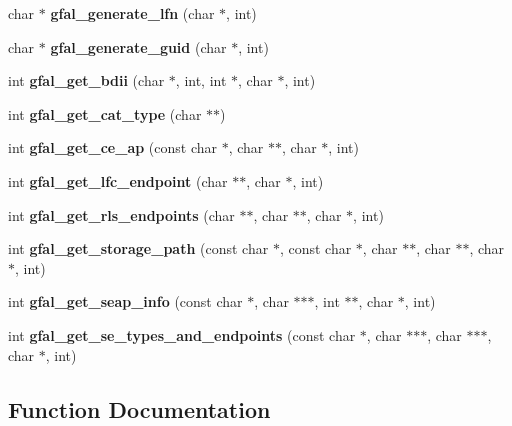\begin{CompactItemize}
\item 
char $\ast$ \textbf{gfal\_\-generate\_\-lfn} (char $\ast$, int)\label{group__internal__group_gcd48b57bf9659be5204319918c6f9d20}

\item 
char $\ast$ \textbf{gfal\_\-generate\_\-guid} (char $\ast$, int)\label{group__internal__group_g8311ede197e204e57029165fbc3898d6}

\item 
int \textbf{gfal\_\-get\_\-bdii} (char $\ast$, int, int $\ast$, char $\ast$, int)\label{group__internal__group_gc5a167111fbd4564bdbd7a194a8ebbad}

\item 
int \textbf{gfal\_\-get\_\-cat\_\-type} (char $\ast$$\ast$)\label{group__internal__group_gc08ad608f2ca57ec2883c799a3b6bf11}

\item 
int \textbf{gfal\_\-get\_\-ce\_\-ap} (const char $\ast$, char $\ast$$\ast$, char $\ast$, int)\label{group__internal__group_ged7eddae06a6ae76e7835ad89069f23f}

\item 
int \textbf{gfal\_\-get\_\-lfc\_\-endpoint} (char $\ast$$\ast$, char $\ast$, int)\label{group__internal__group_g6b5c96e786925f6ad93fa57f998173cc}

\item 
int \textbf{gfal\_\-get\_\-rls\_\-endpoints} (char $\ast$$\ast$, char $\ast$$\ast$, char $\ast$, int)\label{group__internal__group_ge98063cb83cedc1a6e6fe0ef8d35c447}

\item 
int \textbf{gfal\_\-get\_\-storage\_\-path} (const char $\ast$, const char $\ast$, char $\ast$$\ast$, char $\ast$$\ast$, char $\ast$, int)\label{group__internal__group_gb3f2c6e488fd2ede0d16bd7f4cdd3549}

\item 
int \textbf{gfal\_\-get\_\-seap\_\-info} (const char $\ast$, char $\ast$$\ast$$\ast$, int $\ast$$\ast$, char $\ast$, int)\label{group__internal__group_ge114394c3fd91f2ab9382dd884dd0693}

\item 
int \textbf{gfal\_\-get\_\-se\_\-types\_\-and\_\-endpoints} (const char $\ast$, char $\ast$$\ast$$\ast$, char $\ast$$\ast$$\ast$, char $\ast$, int)\label{group__internal__group_g2c87f70238deffb3907d5a612e847fd4}

\end{CompactItemize}


\subsection{Function Documentation}
